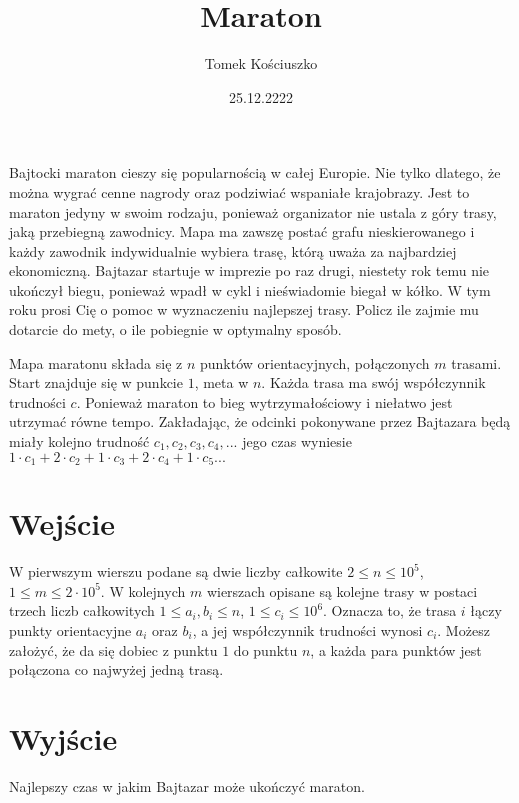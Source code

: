 \documentclass[zad,zawodnik,utf8]{sinol}
\title{Maraton}
\author{Tomek Kościuszko}
\date{25.12.2222}
\begin{document}
\begin{tasktext}%
    Bajtocki maraton cieszy się popularnością w całej Europie. Nie tylko dlatego, że można wygrać cenne nagrody oraz podziwiać wspaniałe krajobrazy. Jest to maraton jedyny w swoim rodzaju, ponieważ organizator nie ustala z góry trasy, jaką przebiegną zawodnicy. Mapa ma zawszę postać grafu nieskierowanego i każdy zawodnik indywidualnie wybiera trasę, którą uważa za najbardziej ekonomiczną.
    Bajtazar startuje w imprezie po raz drugi, niestety rok temu nie ukończył biegu, ponieważ wpadł w cykl i nieświadomie biegał w kółko. W tym roku prosi Cię o pomoc w wyznaczeniu najlepszej trasy. Policz ile zajmie mu dotarcie do mety, o ile pobiegnie w optymalny sposób.

    Mapa maratonu składa się z $n$ punktów orientacyjnych, połączonych $m$ trasami. Start znajduje się w punkcie $1$, meta w $n$. Każda trasa ma swój współczynnik trudności $c$. Ponieważ maraton to bieg wytrzymałościowy i niełatwo jest utrzymać równe tempo. Zakładając, że odcinki pokonywane przez Bajtazara będą miały kolejno trudność $c_{1}, c_{2}, c_{3}, c_{4}, ...$ jego czas wyniesie $1\cdot c_{1} + 2\cdot c_{2} + 1 \cdot c_{3} + 2 \cdot c_{4} + 1\cdot c_{5} ...$

\section{Wejście}
    W pierwszym wierszu podane są dwie liczby całkowite $2\leq n\leq 10^{5}$, $1\leq m\leq 2 \cdot 10^{5}$.
    W kolejnych $m$ wierszach opisane są kolejne trasy w postaci trzech liczb całkowitych $1\leq a_{i}, b_{i}\leq n$, $1\leq c_{i}\leq 10^{6}$. Oznacza to, że trasa $i$ łączy punkty orientacyjne $a_{i}$ oraz $b_{i}$, a jej współczynnik trudności wynosi $c_{i}$. Możesz założyć, że da się dobiec z punktu $1$ do punktu $n$, a każda para punktów jest połączona co najwyżej jedną trasą.

\section{Wyjście}
    Najlepszy czas w jakim Bajtazar może ukończyć maraton.




\end{tasktext}
\end{document}
